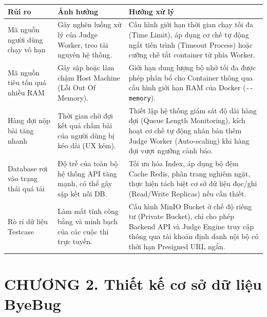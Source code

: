 \documentclass[12pt,a4paper]{article}
\renewcommand{\_}{\BreakableUnderscore}
\begin{document}
\begin{longtable}[]{
  |>{\raggedright\arraybackslash}p{}
  |>{\raggedright\arraybackslash}p{}
  |>{\raggedright\arraybackslash}p{}|}
\hline\rowcolor{tableHeader}
\begin{minipage}[b]{\linewidth}\raggedright
Rủi ro
\end{minipage} & \begin{minipage}[b]{\linewidth}\raggedright
Ảnh hưởng
\end{minipage} & \begin{minipage}[b]{\linewidth}\raggedright
Hướng xử lý
\end{minipage} \\
\hline
\endhead
\hline
\endlastfoot
Mã nguồn người dùng chạy vô hạn & Gây nghẽn luồng xử lý của Judge Worker, treo tài nguyên hệ thống. & Cấu hình giới hạn thời gian chạy tối đa (Time Limit), áp dụng cơ chế tự động ngắt tiến trình (Timeout Process) hoặc cưỡng chế tắt container từ phía Worker. \\
\hline
Mã nguồn tiêu tốn quá nhiều RAM & Gây sập hoặc làm chậm Host Machine (Lỗi Out Of Memory). & Giới hạn dung lượng bộ nhớ tối đa được phép phân bổ cho Container thông qua cấu hình giới hạn RAM của Docker (\texttt{-\/-memory}). \\
\hline
Hàng đợi nộp bài tăng nhanh & Thời gian chờ đợi kết quả chấm bài của người dùng bị kéo dài (UX kém). & Thiết lập hệ thống giám sát độ dài hàng đợi (Queue Length Monitoring), kích hoạt cơ chế tự động nhân bản thêm Judge Worker (Auto-scaling) khi hàng đợi vượt ngưỡng cảnh báo. \\
\hline
Database rơi vào trạng thái quá tải & Độ trễ của toàn bộ hệ thống API tăng mạnh, có thể gây sập kết nối DB. & Tối ưu hóa Index, áp dụng bộ đệm Cache Redis, phân trang nghiêm ngặt, thực hiện tách biệt cơ sở dữ liệu đọc/ghi (Read/Write Replicas) nếu cần thiết. \\
\hline
Rò rỉ dữ liệu Testcase & Làm mất tính công bằng và minh bạch của các cuộc thi trực tuyến. & Cấu hình MinIO Bucket ở chế độ riêng tư (Private Bucket), chỉ cho phép Backend API và Judge Engine truy cập thông qua tài khoản định danh nội bộ có thời hạn Presigned URL ngắn. \\
\hline
\end{longtable}

\newpage

\section{CHƯƠNG 2. Thiết kế cơ sở dữ liệu ByeBug}
\end{document}
